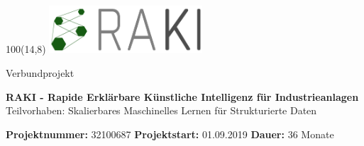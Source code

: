 %
%
%
%
%
%
%
%
%
%
%
%
%
\begin{textblock}{100}(14,8)
 \includegraphics[width=5.7cm,keepaspectratio]{logo/raki.png}
\end{textblock}

\setlength\parindent{0pt}

{\Large\color{LodGray} Verbundprojekt}

\vspace{1.5ex}
{\huge\color{LodGray}\textbf{RAKI - Rapide Erklärbare Künstliche Intelligenz für Industrieanlagen}\\ \Large Teilvorhaben: \LARGE Skalierbares Maschinelles Lernen für Strukturierte Daten}

\vspace{1.5ex}

{\small\color{LodGray}
\textbf{Projektnummer:} 32100687
\hspace{2.5cm}
\textbf{Projektstart:} 01.09.2019
\hspace{2.5cm}
\textbf{Dauer:} 36 Monate}

\vspace{4ex}


\vspace{2ex}

{\Huge \textbf{\deliverableTitle}}

